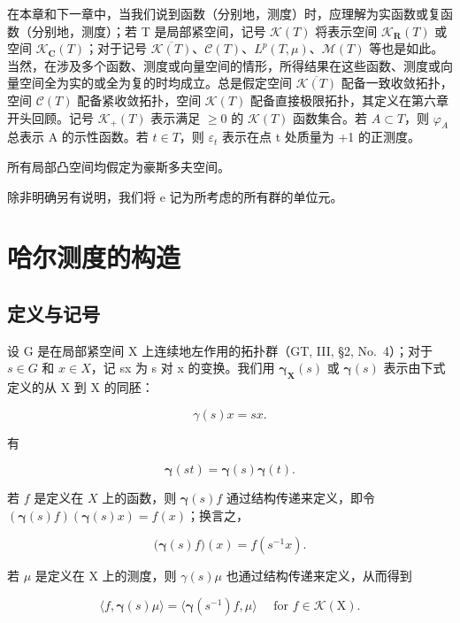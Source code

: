 在本章和下一章中，当我们说到函数（分别地，测度）时，应理解为实函数或复函数（分别地，测度）；若 T 是局部紧空间，记号 \(\mathcal{K}(T)\) 将表示空间 \(\mathcal{K}_{\mathbf{R}}(T)\) 或空间 \(\mathcal{K}_{\mathbf{C}}(T)\)；对于记号 \(\overline{\mathcal{K}(T)}\)、\(\mathcal{C}(T)\)、\(L^{p}(T,\mu)\)、\(\mathcal{M}(T)\) 等也是如此。当然，在涉及多个函数、测度或向量空间的情形，所得结果在这些函数、测度或向量空间全为实的或全为复的时均成立。总是假定空间 \(\overline{\mathcal{K}(T)}\) 配备一致收敛拓扑，空间 \(\mathcal{C}(T)\) 配备紧收敛拓扑，空间 \(\mathcal{K}(T)\) 配备直接极限拓扑，其定义在第六章开头回顾。记号 \(\mathcal{K}_{+}(T)\) 表示满足 \(\geqslant0\) 的 \(\mathcal{K}(T)\) 函数集合。若 \(A\subset T\)，则 \(\varphi_{A}\) 总表示 A 的示性函数。若 \(t\in T\)，则 \(\varepsilon_{t}\) 表示在点 t 处质量为 +1 的正测度。

所有局部凸空间均假定为豪斯多夫空间。

除非明确另有说明，我们将 e 记为所考虑的所有群的单位元。

\section{哈尔测度的构造}

\subsection{定义与记号}

设 G 是在局部紧空间 X 上连续地左作用的拓扑群（GT, III, §2, No.~4）；对于 \(s \in G\) 和 \(x \in X\)，记 sx 为 s 对 x 的变换。我们用 \(\boldsymbol{\gamma}_{\mathbf{X}}(s)\) 或 \(\boldsymbol{\gamma}(s)\) 表示由下式定义的从 X 到 X 的同胚：

\[
\gamma (s) x = s x.\tag{1}
\]

有

\[
\boldsymbol {\gamma} (s t) = \boldsymbol {\gamma} (s) \boldsymbol {\gamma} (t).\tag{2}
\]

若 \(f\) 是定义在 \(X\) 上的函数，则 \(\boldsymbol{\gamma}(s)f\) 通过结构传递来定义，即令 \((\boldsymbol{\gamma}(s)f)(\boldsymbol{\gamma}(s)x) = f(x)\)；换言之，

\[
\big (\boldsymbol {\gamma} (s) f \big) (x) = f (s ^ {- 1} x).\tag{3}
\]

若 \(\mu\) 是定义在 X 上的测度，则 \(\gamma(s)\mu\) 也通过结构传递来定义，从而得到

\[
\langle f, \boldsymbol {\gamma} (s) \mu \rangle = \langle \boldsymbol {\gamma} (s ^ {- 1}) f, \mu \rangle \quad \text {   for   } f \in \mathscr {K} (\mathrm{X}).\tag{4}
\]

